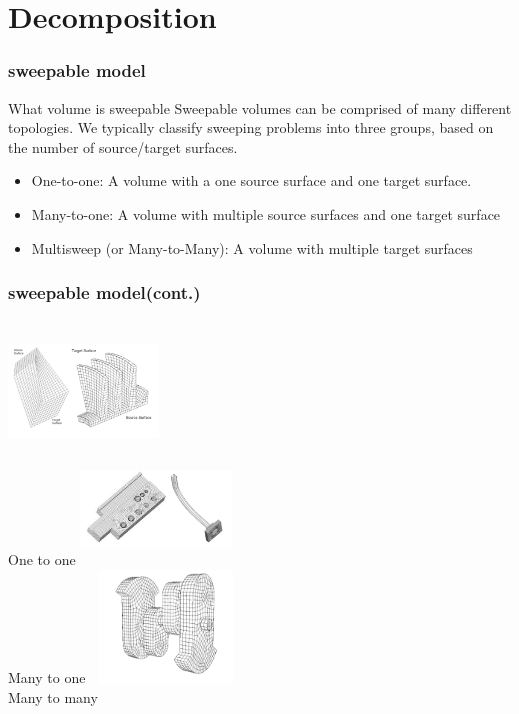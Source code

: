 \documentclass[fleqn]{beamer}
\begin{document}
\section{Decomposition}
\begin{frame}
\frametitle{sweepable model}
\begin{block}{What volume is sweepable}
 Sweepable volumes can be comprised of many
different topologies. We typically classify sweeping problems into three groups, based on the number of
source/target surfaces.
\begin{itemize}
 \item One-to-one: A volume with a one source surface and one target surface.
 \item Many-to-one: A volume with multiple source surfaces and one target surface
 \item Multisweep (or Many-to-Many): A volume with multiple target surfaces
\end{itemize}
\end{block}
\end{frame}

\begin{frame}
 \frametitle{sweepable model(cont.)}
 \begin{columns}[t]
\centering
\includegraphics[width=4cm,height=3cm]{figures/one_to_one.png}\\{One to one}
\centering
\includegraphics[width=4cm,height=3cm]{figures/many_to_one.png}\\{Many to one}
\centering
\includegraphics[width=4cm,height=3cm]{figures/many_to_many.png}\\{Many to many}
\end{columns}
\end{frame}
\end{document}
